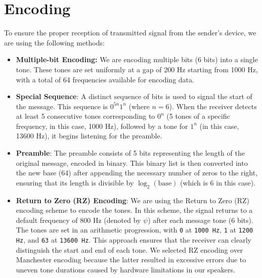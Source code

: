 \documentclass[11pt]{article}
\begin{document}
\maketitle
\section{Encoding}
To ensure the proper reception of transmitted signal from the sender's device, we are using the following methods:
\begin{itemize}
    \item \textbf{Multiple-bit Encoding:} We are encoding multiple bits (6 bits) into a single tone. These tones are set uniformly at a gap of 200 Hz starting from 1000 Hz, with a total of 64 frequencies available for encoding data.
    \item \textbf{Special Sequence}: A distinct sequence of bits is used to signal the start of the message. This sequence is $0^{5n}1^n$ (where $n=6$). When the receiver detects at least 5 consecutive tones corresponding to $0^n$ (5 tones of a specific frequency, in this case, 1000 Hz), followed by a tone for $1^n$ (in this case, 13600 Hz), it begins listening for the preamble.

    \item \textbf{Preamble}: The preamble consists of 5 bits representing the length of the original message, encoded in binary. This binary list is then converted into the new base (64) after appending the necessary number of zeros to the right, ensuring that its length is divisible by $\log_2(\text{base})$ (which is 6 in this case).
    \item \textbf{Return to Zero (RZ) Encoding}: We are using the Return to Zero (RZ) encoding scheme to encode the tones. In this scheme, the signal returns to a default frequency of 800 Hz (denoted by \(\psi\)) after each message tone (6 bits). The tones are set in an arithmetic progression, with \texttt{0} at \texttt{1000 Hz}, \texttt{1} at \texttt{1200 Hz}, and \texttt{63} at \texttt{13600 Hz}. This approach ensures that the receiver can clearly distinguish the start and end of each tone. We selected RZ encoding over Manchester encoding because the latter resulted in excessive errors due to uneven tone durations caused by hardware limitations in our speakers.

\end{itemize}
\end{document}
